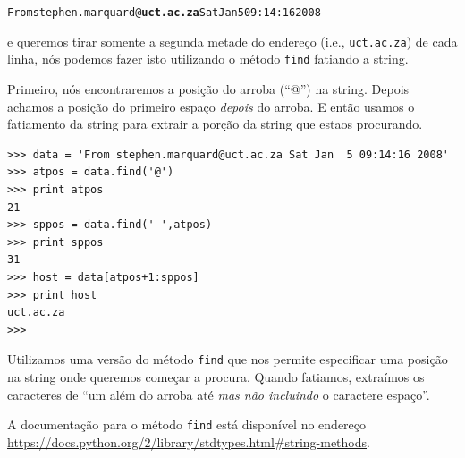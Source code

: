 {\beforeverb
\begin{alltt}
From stephen.marquard@{\bf uct.ac.za} Sat Jan  5 09:14:16 2008
\end{alltt}
\afterverb


e queremos tirar somente a segunda metade do endereço (i.e., {\tt uct.ac.za})
de cada linha, nós podemos fazer isto utilizando o método {\tt find} fatiando
a string.


Primeiro, nós encontraremos a posição do arroba (``@'') na string. Depois
achamos a posição do primeiro espaço \emph{depois} do arroba. E então usamos
o fatiamento da string para extrair a porção da string que estaos procurando.

\beforeverb
\begin{verbatim}
>>> data = 'From stephen.marquard@uct.ac.za Sat Jan  5 09:14:16 2008'
>>> atpos = data.find('@')
>>> print atpos
21
>>> sppos = data.find(' ',atpos)
>>> print sppos
31
>>> host = data[atpos+1:sppos]
>>> print host
uct.ac.za
>>> 
\end{verbatim}
\afterverb
%
%
Utilizamos uma versão do método {\tt find} que nos permite especificar uma
posição na string onde queremos começar a procura. Quando fatiamos, extraímos
os caracteres de ``um além do arroba até \emph{mas não incluindo} o caractere
espaço''.


A documentação para o método {\tt find} está disponível no endereço
\url{https://docs.python.org/2/library/stdtypes.html#string-methods}.

}
